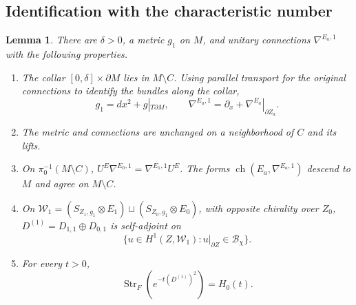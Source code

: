 \documentclass[12pt,reqno]{amsart}
\numberwithin{equation}{section}
\newtheorem{lemma}[theorem]{Lemma}
\theoremstyle{definition}
\newcommand{\ch}{\operatorname{ch}}
\newcommand{\Str}{\operatorname{Str}}
\newcommand{\cW}{\mathscr W}
\begin{document}
\subsection{Identification with the characteristic number}

\begin{lemma}\label{lem:collar-deformation}
There are $\delta>0$, a metric $g_1$ on $M$, and unitary connections
$\nabla^{E_a,1}$ with the following properties.
\begin{enumerate}[label=\textup{(\roman*)},leftmargin=2.8em]
\item\label{collar:product}
The collar $[0,\delta]\times\partial M$ lies in $M\setminus C$.  Using
parallel transport for the original connections to identify the
bundles along the collar,
\[
 g_1=dx^2+g|_{T\partial M},\qquad
 \nabla^{E_a,1}=\partial_x+\nabla^{E_a}|_{\partial Z_a}.
\]
\item\label{collar:fixed}
The metric and connections are unchanged on a neighborhood of $C$
and its lifts.
\item\label{collar:exterior}
On $\pi_0^{-1}(M\setminus C)$,
$U^E\nabla^{E_0,1}=\nabla^{E_1,1}U^E$.
The forms $\ch(E_a,\nabla^{E_a,1})$ descend to $M$ and agree on
$M\setminus C$.
\item\label{collar:domain}
On $\cW_1=(S_{Z_1,g_1}\otimes E_1)\sqcup
(S_{Z_0,g_1}\otimes E_0)$, with opposite chirality over $Z_0$,
$D^{(1)}=D_{1,1}\oplus D_{0,1}$ is self-adjoint on
\[
 \{u\in H^1(Z,\cW_1):u|_{\partial Z}\in\mathcal B_\chi\}.
\]
\item\label{collar:heat}
For every $t>0$,
\begin{equation}\label{eq:collar-product-heat}
 \Str_F(e^{-t(D^{(1)})^2})=H_0(t).
\end{equation}
\end{enumerate}
\end{lemma}
\end{document}
